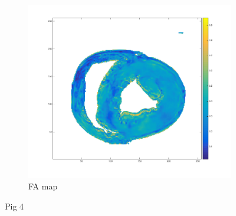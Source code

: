 \begin{figure}
\begin{subfigure}{.31\textwidth}
        \includegraphics[width=\textwidth]{figures/pig4_fa_21}
        \caption{FA map}
        \label{fig:pig4_fa}
    \end{subfigure}
    \caption{Pig 4}
    \label{fig:pig4}
    

\end{figure}
